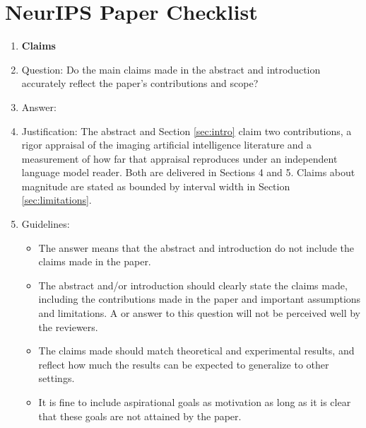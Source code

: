 \documentclass{article}
\begin{document}
\newpage
\section*{NeurIPS Paper Checklist}

\begin{enumerate}

\item {\bf Claims}
    \item[] Question: Do the main claims made in the abstract and introduction accurately reflect the paper's contributions and scope?
    \item[] Answer: \answerYes{}
    \item[] Justification: The abstract and Section \ref{sec:intro} claim two contributions, a rigor appraisal of the imaging artificial intelligence literature and a measurement of how far that appraisal reproduces under an independent language model reader. Both are delivered in Sections 4 and 5. Claims about magnitude are stated as bounded by interval width in Section \ref{sec:limitations}.
    \item[] Guidelines:
    \begin{itemize}
        \item The answer \answerNA{} means that the abstract and introduction do not include the claims made in the paper.
        \item The abstract and/or introduction should clearly state the claims made, including the contributions made in the paper and important assumptions and limitations. A \answerNo{} or \answerNA{} answer to this question will not be perceived well by the reviewers. 
        \item The claims made should match theoretical and experimental results, and reflect how much the results can be expected to generalize to other settings. 
        \item It is fine to include aspirational goals as motivation as long as it is clear that these goals are not attained by the paper. 
    \end{itemize}


\end{enumerate}
\end{document}

